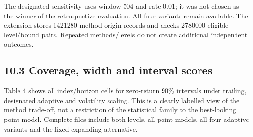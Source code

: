 \documentclass[11pt]{article}
\begin{document}
The designated sensitivity uses window 504 and rate 0.01; it was not chosen as the winner of the retrospective evaluation. All four variants remain available. The extension stores 1421280 method-origin records and checks 2780000 eligible level/bound pairs. Repeated methods/levels do not create additional independent outcomes.

\subsection*{10.3 Coverage, width and interval scores}

Table 4 shows all index/horizon cells for zero-return 90\% intervals under trailing, designated adaptive and volatility scaling. This is a clearly labelled view of the method trade-off, not a restriction of the statistical family to the best-looking point model. Complete files include both levels, all point models, all four adaptive variants and the fixed expanding alternative.
\end{document}
